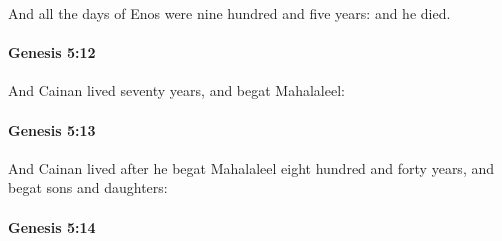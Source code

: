 			And all the days of Enos were nine hundred and five years: and he died.


		\paragraph{Genesis 5:12} %
			\label{GENESIS-5-12}

			And Cainan lived seventy years, and begat Mahalaleel:


		\paragraph{Genesis 5:13} %
			\label{GENESIS-5-13}

			And Cainan lived after he begat Mahalaleel eight hundred and forty years, and begat sons and daughters:


		\paragraph{Genesis 5:14} %
			\label{GENESIS-5-14}

